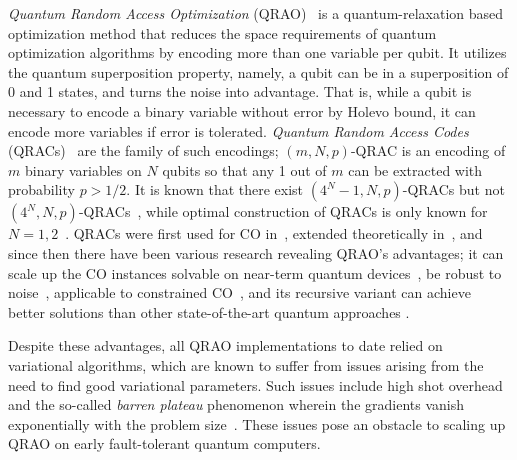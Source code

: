\documentclass[conference,10pt]{IEEEtran}
\begin{document}
\emph{Quantum Random Access Optimization} (QRAO)~\cite{Fulleretal2024,teramoto2023quantumrelaxation} is a quantum-relaxation based optimization method that reduces the space requirements of quantum optimization algorithms by encoding more than one variable per qubit. It utilizes the quantum superposition property, namely, a qubit can be in a superposition of 0 and 1 states, and turns the noise into advantage. That is, while a qubit is necessary to encode a binary variable without error by Holevo bound, %
it can encode more variables if error is tolerated. \emph{Quantum Random Access Codes} (QRACs)~\cite{ANTV2002,Nayak99} are the family of such encodings; $(m,N,p)$-QRAC is an encoding of $m$ binary variables on $N$ qubits so that any 1 out of $m$ can be extracted with probability $p > 1/2$. It is known that there exist $(4^N-1,N,p)$-QRACs but not $(4^N,N,p)$-QRACs~\cite{Hayashi_2006}, while optimal construction of QRACs is only known for $N=1,2$~\cite{Hayashi_2006,ImamichiRaymond2018,Man_inska_2022}. QRACs were first used for CO in~\cite{Fulleretal2024}, extended theoretically in~\cite{teramoto2023quantumrelaxation}, and since then there have been various research revealing QRAO's advantages; it can scale up the CO instances solvable on near-term quantum devices~\cite{TRI2023,NgoNguyen2024}, be robust to noise~\cite{Tamuraetal2024}, applicable to constrained CO~\cite{sharma2024quantumrelaxationsolvingmultiple}, and its recursive variant can achieve better solutions than other state-of-the-art quantum approaches
\cite{kondo2024recursive}.  

Despite these advantages, all QRAO implementations to date relied on variational algorithms, which are known to suffer from issues arising from the need to find good variational parameters. Such issues include high shot overhead and the so-called \emph{barren plateau} phenomenon wherein the gradients vanish exponentially with the problem size~\cite{fontana2023adjoint,Larocca2022,McClean_2018}. These issues pose an obstacle to scaling up QRAO on early fault-tolerant quantum computers.
\end{document}

